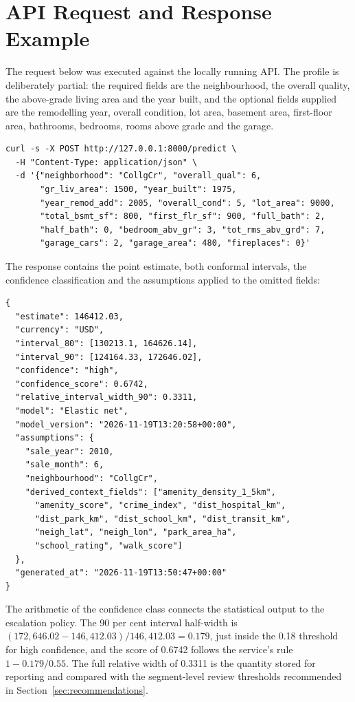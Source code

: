 \section{API Request and Response Example}
\label{app:api}

The request below was executed against the locally running API. The profile is
deliberately partial: the required fields are the neighbourhood, the overall quality,
the above-grade living area and the year built, and the optional fields supplied are
the remodelling year, overall condition, lot area, basement area, first-floor area,
bathrooms, bedrooms, rooms above grade and the garage.

{\footnotesize
\begin{verbatim}
curl -s -X POST http://127.0.0.1:8000/predict \
  -H "Content-Type: application/json" \
  -d '{"neighborhood": "CollgCr", "overall_qual": 6,
       "gr_liv_area": 1500, "year_built": 1975,
       "year_remod_add": 2005, "overall_cond": 5, "lot_area": 9000,
       "total_bsmt_sf": 800, "first_flr_sf": 900, "full_bath": 2,
       "half_bath": 0, "bedroom_abv_gr": 3, "tot_rms_abv_grd": 7,
       "garage_cars": 2, "garage_area": 480, "fireplaces": 0}'
\end{verbatim}
}

The response contains the point estimate, both conformal intervals, the confidence
classification and the assumptions applied to the omitted fields:

{\footnotesize
\begin{verbatim}
{
  "estimate": 146412.03,
  "currency": "USD",
  "interval_80": [130213.1, 164626.14],
  "interval_90": [124164.33, 172646.02],
  "confidence": "high",
  "confidence_score": 0.6742,
  "relative_interval_width_90": 0.3311,
  "model": "Elastic net",
  "model_version": "2026-11-19T13:20:58+00:00",
  "assumptions": {
    "sale_year": 2010,
    "sale_month": 6,
    "neighbourhood": "CollgCr",
    "derived_context_fields": ["amenity_density_1_5km",
      "amenity_score", "crime_index", "dist_hospital_km",
      "dist_park_km", "dist_school_km", "dist_transit_km",
      "neigh_lat", "neigh_lon", "park_area_ha",
      "school_rating", "walk_score"]
  },
  "generated_at": "2026-11-19T13:50:47+00:00"
}
\end{verbatim}
}

The arithmetic of the confidence class connects the statistical output to the
escalation policy. The 90 per cent interval half-width is
$(172{,}646.02 - 146{,}412.03)/146{,}412.03 = 0.179$, just inside the 0.18 threshold
for high confidence, and the score of 0.6742 follows the service's rule
$1 - 0.179/0.55$. The full relative width of 0.3311 is the quantity stored for
reporting and compared with the segment-level review thresholds recommended in
Section~\ref{sec:recommendations}.

